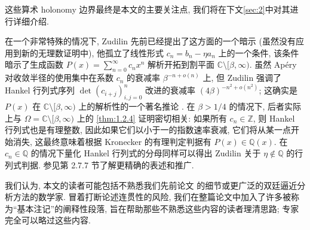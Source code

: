 这些算术 holonomy 边界最终是本文的主要关注点, 我们将在下文\autoref{sec:2}中对其进行详细介绍.

\begin{remark}\label{rem:1.2.5}
在一个非常特殊的情况下, Zudilin \cite{Zud17} 先前已经提出了这方面的一个暗示
(虽然没有应用到新的无理数证明中), 
他孤立了线性形式 $c_n = b_n - \eta a_n$ 上的一个条件, 
该条件暗示了生成函数 $P(x) = \sum_{n=0}^{\infty} c_n x^n$ 解析开拓到割平面 $\mathbb{C} \setminus [\beta, \infty)$.
虽然 Ap{\'e}ry 对收敛半径的使用集中在系数 $c_n$ 的衰减率 $\beta^{-n+o(n)}$ 上, 
但 Zudilin 强调了 Hankel 行列式序列 $\det(c_{i+j})_{i,j=0}^n$ 改进的衰减率 $(4\beta)^{-n^2+o(n^2)}$;
这确实是 $P(x)$ 在 $\mathbb{C} \setminus [\beta, \infty)$ 上的解析性的一个著名推论 \cite{Pol28}\cite{Pom69}.
在 $\beta > 1/4$ 的情况下, 后者实际上与 $\Omega = \mathbb{C} \setminus [\beta, \infty)$ 上的 \autoref{thm:1.2.4} 证明密切相关:
如果所有 $c_n \in \mathbb{Z}$, 则 Hankel 行列式也是有理整数, 
因此如果它们以小于一的指数速率衰减, 它们将从某一点开始消失, 
这最终意味着根据 Kronecker 的有理判定判据有 $P(x) \in \mathbb{Q}(x)$.
在 $c_n \in \mathbb{Q}$ 的情况下量化 Hankel 行列式的分母同样可以得出 Zudilin 关于 $\eta \notin \mathbb{Q}$ 的行列式判据.
参见第 2.7.7 节了解更精确的表述和推广.\end{remark}

\begin{remark}\label{rem:1.2.6}
我们认为, 本文的读者可能包括不熟悉我们先前论文 \cite{CDT21} 的细节或更广泛的双廷逼近分析方法的数学家.
冒着打断论述连贯性的风险, 我们在整篇论文中加入了许多被称为``基本注记''的阐释性段落, 
旨在帮助那些不熟悉这些内容的读者理清思路; 专家完全可以略过这些内容.\end{remark}

